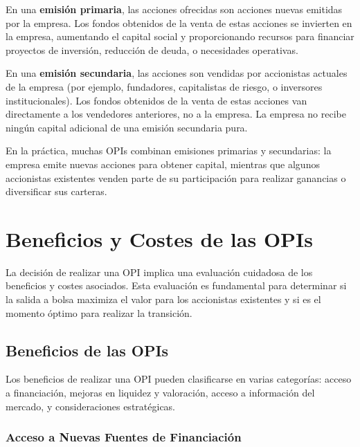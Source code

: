 \begin{definicion}
En una \textbf{emisión primaria}, las acciones ofrecidas son acciones nuevas emitidas por la empresa. Los fondos obtenidos de la venta de estas acciones se invierten en la empresa, aumentando el capital social y proporcionando recursos para financiar proyectos de inversión, reducción de deuda, o necesidades operativas.
\end{definicion}

\begin{definicion}
En una \textbf{emisión secundaria}, las acciones son vendidas por accionistas actuales de la empresa (por ejemplo, fundadores, capitalistas de riesgo, o inversores institucionales). Los fondos obtenidos de la venta de estas acciones van directamente a los vendedores anteriores, no a la empresa. La empresa no recibe ningún capital adicional de una emisión secundaria pura.
\end{definicion}

En la práctica, muchas OPIs combinan emisiones primarias y secundarias: la empresa emite nuevas acciones para obtener capital, mientras que algunos accionistas existentes venden parte de su participación para realizar ganancias o diversificar sus carteras.

\section{Beneficios y Costes de las OPIs}

La decisión de realizar una OPI implica una evaluación cuidadosa de los beneficios y costes asociados. Esta evaluación es fundamental para determinar si la salida a bolsa maximiza el valor para los accionistas existentes y si es el momento óptimo para realizar la transición.

\subsection{Beneficios de las OPIs}

Los beneficios de realizar una OPI pueden clasificarse en varias categorías: acceso a financiación, mejoras en liquidez y valoración, acceso a información del mercado, y consideraciones estratégicas.

\subsubsection{Acceso a Nuevas Fuentes de Financiación}

